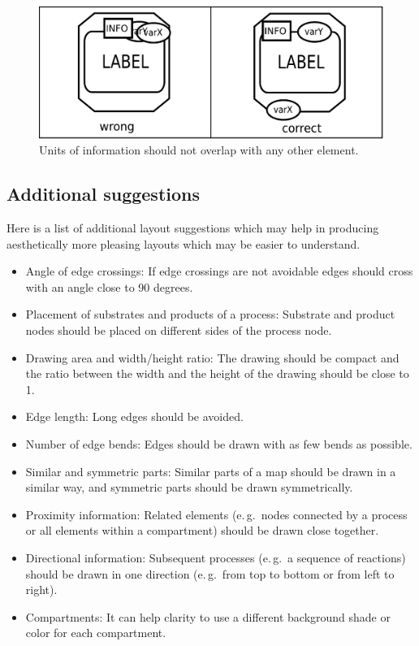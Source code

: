 \begin{figure}[h!]
  \centering
  \includegraphics[scale=0.5]{images/layout-unit-information}
  \caption{Units of information should not overlap with any
  other element.}\label{fig:layout7}
\end{figure}

\subsection{Additional suggestions}

Here is a list of additional layout suggestions which may help in
producing aesthetically more pleasing layouts which may be easier to
understand.

\begin{itemize}
  \item Angle of edge crossings: If edge crossings are not avoidable
  edges should cross with an angle close to 90 degrees.
  \item Placement of substrates and products of a process:
  Substrate and product nodes should be placed
  on different sides of the process node.
  \item Drawing area and width/height ratio: The drawing should
  be compact and the ratio between the width and the height
  of the drawing should be close to 1.
  \item Edge length: Long edges should be avoided.
  \item Number of edge bends: Edges should be drawn with
  as few bends as possible.
  \item Similar and symmetric parts: Similar parts of a map
  should be drawn in a similar way, and symmetric parts
  should be drawn symmetrically.
  \item Proximity information: Related elements (e.\,g.~nodes
  connected by a process or all elements within a compartment)
  should be drawn close together.
  \item Directional information: Subsequent processes (e.\,g.~a sequence
  of reactions) should be drawn in one direction (e.\,g.~from
  top to bottom or from left to right).
  \item Compartments: It can help clarity to use a different background shade or color for each compartment.
\end{itemize}
